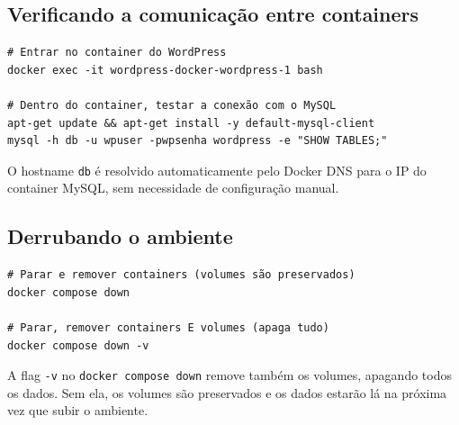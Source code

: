 \subsection{Verificando a comunicação entre containers}

\begin{verbatim}
# Entrar no container do WordPress
docker exec -it wordpress-docker-wordpress-1 bash

# Dentro do container, testar a conexão com o MySQL
apt-get update && apt-get install -y default-mysql-client
mysql -h db -u wpuser -pwpsenha wordpress -e "SHOW TABLES;"
\end{verbatim}

O hostname \texttt{db} é resolvido automaticamente pelo Docker DNS para o IP do container MySQL, sem necessidade de configuração manual.

\subsection{Derrubando o ambiente}

\begin{verbatim}
# Parar e remover containers (volumes são preservados)
docker compose down

# Parar, remover containers E volumes (apaga tudo)
docker compose down -v
\end{verbatim}

A flag \texttt{-v} no \texttt{docker compose down} remove também os volumes, apagando todos os dados. Sem ela, os volumes são preservados e os dados estarão lá na próxima vez que subir o ambiente.
